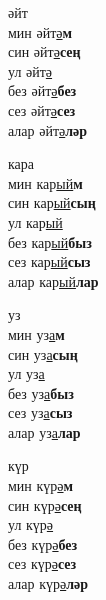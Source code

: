 \begin{multicols}{4}
\begin{enumerate}
\begin{minipage}{\linewidth}
    \item
    әйт\\
    мин әйт\underline{ә}\textbf{м}\\
    син әйт\underline{ә}\textbf{сең}\\
    ул әйт\underline{ә}\\
    без әйт\underline{ә}\textbf{без}\\
    сез әйт\underline{ә}\textbf{сез}\\
    алар әйт\underline{ә}\textbf{ләр}\\
\end{minipage}

\begin{minipage}{\linewidth}
    \item
    кара\\
    мин кар\underline{ый}\textbf{м}\\
    син кар\underline{ый}\textbf{сың}\\
    ул кар\underline{ый}\\
    без кар\underline{ый}\textbf{быз}\\
    сез кар\underline{ый}\textbf{сыз}\\
    алар кар\underline{ый}\textbf{лар}\\
\end{minipage}

\begin{minipage}{\linewidth}
    \item
    уз\\
    мин уз\underline{а}\textbf{м}\\
    син уз\underline{а}\textbf{сың}\\
    ул уз\underline{а}\\
    без уз\underline{а}\textbf{быз}\\
    сез уз\underline{а}\textbf{сыз}\\
    алар уз\underline{а}\textbf{лар}\\
\end{minipage}

\begin{minipage}{\linewidth}
    \item
    күр\\
    мин күр\underline{ә}\textbf{м}\\
    син күр\underline{ә}\textbf{сең}\\
    ул күр\underline{ә}\\
    без күр\underline{ә}\textbf{без}\\
    сез күр\underline{ә}\textbf{сез}\\
    алар күр\underline{ә}\textbf{ләр}\\
\end{minipage}


\end{enumerate}
\end{multicols}
